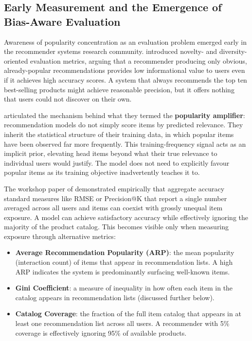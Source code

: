 \documentclass[11pt,a4paper]{report}
\begin{document}
\subsection*{Early Measurement and the Emergence of Bias-Aware Evaluation}

Awareness of popularity concentration as an evaluation problem emerged early in the recommender systems research community. \citet{celma2008novel} introduced novelty- and diversity-oriented evaluation metrics, arguing that a recommender producing only obvious, already-popular recommendations provides low informational value to users even if it achieves high accuracy scores. A system that always recommends the top ten best-selling products might achieve reasonable precision, but it offers nothing that users could not discover on their own.

\citet{abdollahpouri2019managing} articulated the mechanism behind what they termed the \textbf{popularity amplifier}: recommendation models do not simply score items by predicted relevance. They inherit the statistical structure of their training data, in which popular items have been observed far more frequently. This training-frequency signal acts as an implicit prior, elevating head items beyond what their true relevance to individual users would justify. The model does not need to explicitly favour popular items as its training objective inadvertently teaches it to.

The workshop paper of \citet{abdollahpouri2019unfairness} demonstrated empirically that aggregate accuracy standard measures like RMSE or Precision@K that report a single number averaged across all users and items can coexist with grossly unequal item exposure. A model can achieve satisfactory accuracy while effectively ignoring the majority of the product catalog. This becomes visible only when measuring exposure through alternative metrics:

\begin{itemize}
    \item \textbf{Average Recommendation Popularity (ARP)}: the mean popularity (interaction count) of items that appear in recommendation lists. A high ARP indicates the system is predominantly surfacing well-known items.
    \item \textbf{Gini Coefficient}: a measure of inequality in how often each item in the catalog appears in recommendation lists (discussed further below).
    \item \textbf{Catalog Coverage}: the fraction of the full item catalog that appears in at least one recommendation list across all users. A recommender with 5\% coverage is effectively ignoring 95\% of available products.
\end{itemize}
\end{document}
